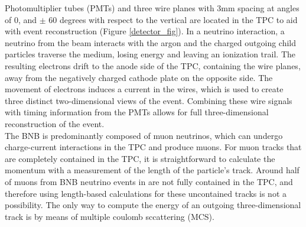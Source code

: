 Photomultiplier tubes (PMTs) and three wire planes with 3mm spacing at angles of 0, and $\pm$ 60 degrees with respect to the vertical are located in the TPC to aid with event reconstruction (Figure \ref{detector_fig}). In a neutrino interaction, a neutrino from the beam interacts with the argon and the charged outgoing child particles traverse the medium, losing energy and leaving an ionization trail. The resulting electrons drift to the anode side of the TPC, containing the wire planes, away from the negatively charged cathode plate on the opposite side. The movement of electrons induces a current in the wires, which is used to create three distinct two-dimensional views of the event. Combining these wire signals with timing information from the PMTs allows for full three-dimensional reconstruction of the event.\\





The BNB is predominantly composed of muon neutrinos, which can undergo charge-current interactions in the TPC and produce muons. For muon tracks that are completely contained in the TPC, it is straightforward to calculate the momentum with a measurement of the length of the particle's track. Around half of muons from BNB neutrino events in {\ub} are not fully contained in the TPC, and therefore using length-based calculations for these uncontained tracks is not a possibility. The only way to compute the energy of an outgoing three-dimensional track is by means of multiple coulomb sccattering (MCS). \\

